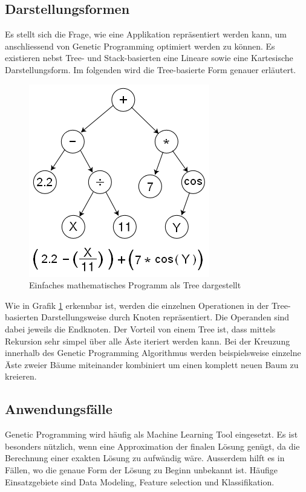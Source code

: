 \subsection{Darstellungsformen}
Es stellt sich die Frage, wie eine Applikation repräsentiert werden kann, um anschliessend von
Genetic Programming optimiert werden zu können. Es existieren nebst Tree- und Stack-basierten
eine Lineare sowie eine Kartesische Darstellungsform. Im folgenden wird die Tree-basierte Form
genauer erläutert.

\begin{figure}[h!]
  \centering
  \includegraphics[scale=0.5]{resources/genetic_program_tree.png}
  \caption{Einfaches mathematisches Programm als Tree dargestellt \cite{Wiki01}}
  \label{fig:gp_tree}
\end{figure}

Wie in Grafik \ref{fig:gp_tree} erkennbar ist, werden die einzelnen Operationen in der Tree-basierten
Darstellungsweise durch Knoten repräsentiert. Die Operanden sind dabei jeweils die Endknoten.
Der Vorteil von einem Tree ist, dass mittels Rekursion sehr simpel über alle Äste iteriert werden
kann. Bei der Kreuzung innerhalb des Genetic Programming Algorithmus werden beispielsweise einzelne
Äste zweier Bäume miteinander kombiniert um einen komplett neuen Baum zu kreieren. \cite{GenTree}

\subsection{Anwendungsfälle}
Genetic Programming wird häufig als Machine Learning Tool eingesetzt. Es ist besonders nützlich, wenn
eine Approximation der finalen Lösung genügt, da die Berechnung einer exakten Lösung zu aufwändig
wäre. Ausserdem hilft es in Fällen, wo die genaue Form der Lösung zu Beginn unbekannt ist. Häufige
Einsatzgebiete sind Data Modeling, Feature selection und Klassifikation.

